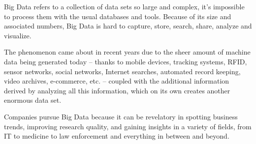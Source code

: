 Big Data refers to a collection of data sets so large and complex, it’s impossible to process them with the usual databases 
and tools. Because of its size and associated numbers, Big Data is hard to capture, store, search, share, analyze and 
visualize. 

The phenomenon came about in recent years due to the sheer amount of machine data being generated today – thanks
to mobile devices, tracking systems, RFID, sensor networks, social networks, Internet searches, automated record keeping,
video archives, e-commerce, etc. – coupled with the additional information derived by analyzing all this information, 
which on its own creates another enormous data set. 

Companies pursue Big Data because it can be revelatory in spotting business trends, improving research quality, 
and gaining insights in a variety of fields, from IT to medicine to law enforcement and everything in between and beyond.

